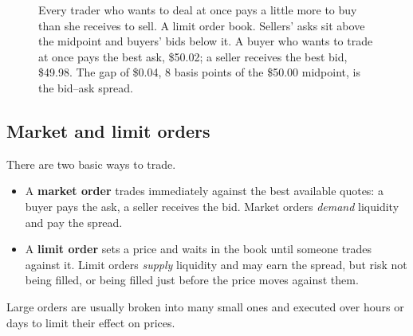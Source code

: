 \begin{figure}[htbp]
{%
}
  \caption{Every trader who wants to deal at once pays a little more to buy than she receives to sell. A limit order book. Sellers' asks sit above the midpoint and buyers'
    bids below it. A buyer who wants to trade at once pays the best ask,
    \$50.02; a seller receives the best bid, \$49.98. The gap of \$0.04,
    8 basis points of the \$50.00 midpoint, is the bid--ask spread.}
  \label{fig:17-book}
\end{figure}


\subsection{Market and limit orders}

There are two basic ways to trade.

\begin{itemize}
  \item A \textbf{market order} trades immediately against the best available quotes: a buyer pays the ask, a seller receives the bid. Market orders \emph{demand} liquidity and pay the spread.
  \item A \textbf{limit order} sets a price and waits in the book until someone trades against it. Limit orders \emph{supply} liquidity and may earn the spread, but risk not being filled, or being filled just before the price moves against them.
\end{itemize}

Large orders are usually broken into many small ones and executed over hours or days to limit their effect on prices.

